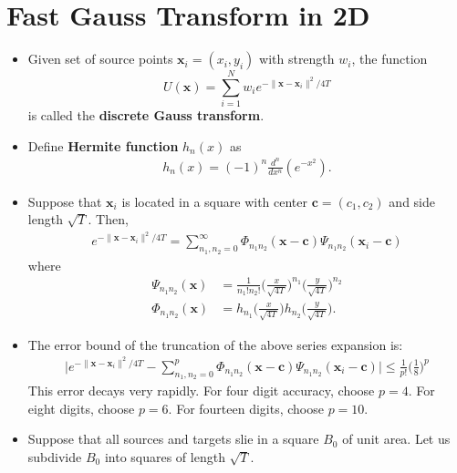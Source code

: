 \documentclass[10pt]{article}
\newcommand{\ve}[1]{\mathbf{#1}}
\begin{document}

\section{Fast Gauss Transform in 2D}\label{sec:fast_gauss_transform_in_2d} %

\begin{itemize}
  \item Given set of source points $\ve{x}_i = (x_i, y_i)$ with strength $w_i$, the function $$U(\ve{x}) = \sum_{i=1}^N w_i e^{-\| \ve{x} - \ve{x}_i \|^2 / 4T}$$ is called the {\bf discrete Gauss transform}.
  
  \item Define \textbf{Hermite function} $h_n(x)$ as
  \begin{align*}
    h_n(x) = (-1)^n \frac{d^n}{dx^n} (e^{-x^2}).
  \end{align*}
  
  \item Suppose that $\ve{x}_i$ is located in a square with center $\ve{c} = (c_1, c_2)$ and side length $\sqrt{T}$. Then,
  \begin{align*}
    e^{-\| \ve{x} - \ve{x}_i \|^2/4T} = \sum_{n_1, n_2 = 0}^\infty \Phi_{n_1 n_2}(\ve{x} - \ve{c}) \Psi_{n_1 n_2}(\ve{x}_i - \ve{c})
  \end{align*}
  where
  \begin{align*}
    \Psi_{n_1 n_2}(\ve{x}) &= \frac{1}{n_1! n_2!}\bigg( \frac{x}{\sqrt{4T}} \bigg)^{n_1} \bigg( \frac{y}{\sqrt{4T}} \bigg)^{n_2}\\
    \Phi_{n_1 n_2}(\ve{x}) &= h_{n_1}\bigg( \frac{x}{\sqrt{4T}} \bigg) h_{n_2}\bigg( \frac{y}{\sqrt{4T}} \bigg).
  \end{align*}
  
  \item The error bound of the truncation of the above series expansion is:
  \begin{align*}
    \bigg| e^{-\| \ve{x} - \ve{x}_i \|^2/4T} - \sum_{n_1, n_2 = 0}^p \Phi_{n_1 n_2}(\ve{x} - \ve{c}) \Psi_{n_1 n_2}(\ve{x}_i - \ve{c}) \bigg| \leq \frac{1}{p!}\bigg( \frac{1}{8} \bigg)^p
  \end{align*}
  This error decays very rapidly. For four digit accuracy, choose $p = 4$. For eight digits, choose $p = 6$. For fourteen digits, choose $p = 10$.
  
  \item Suppose that all sources and targets slie in a square $B_0$ of unit area. Let us subdivide $B_0$ into squares of length $\sqrt{T}$.
  

\end{itemize}
\end{document}
